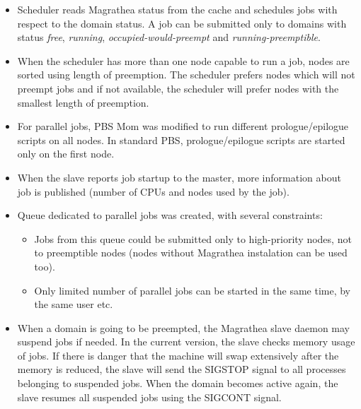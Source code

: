 \documentclass[a4paper]{article}
\begin{document}
\begin{itemize}

\item Scheduler reads Magrathea status from the cache and schedules jobs with
respect to the domain status. A job can be submitted only to domains with
status \emph{free}, \emph{running}, \emph{occupied-would-preempt} and
\emph{running-preemptible}.

\item When the scheduler has more than one node capable to run a job, nodes
are sorted using length of preemption. The scheduler prefers nodes which will
not preempt jobs and if not available, the scheduler will prefer nodes with
the smallest length of preemption.

\item For parallel jobs, PBS Mom was modified to run different
prologue/epilogue scripts on all nodes. In standard PBS, prologue/epilogue
scripts are started only on the first node.

\item When the slave reports job startup to the master, more information about
job is published (number of CPUs and nodes used by the job).

\item Queue dedicated to parallel jobs was created, with several constraints:

    \begin{itemize}

    \item Jobs from this queue could be submitted only to high-priority nodes,
    not to preemptible nodes (nodes without Magrathea instalation can be used
    too).

    \item Only limited number of parallel jobs can be started in the same
    time, by the same user etc.

    \end{itemize}

\item When a domain is going to be preempted, the Magrathea slave daemon may
suspend jobs if needed. In the current version, the slave checks memory usage
of jobs. If there is danger that the machine will swap extensively after the
memory is reduced, the slave will send the SIGSTOP signal to all processes
belonging to suspended jobs. When the domain becomes active again, the slave
resumes all suspended jobs using the SIGCONT signal.

\end{itemize}
\end{document}
